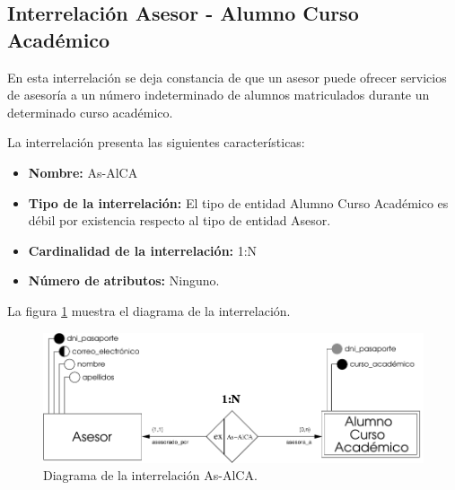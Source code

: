 \subsection{Interrelación Asesor - Alumno Curso Académico}

   \begin{description}
      \item[Definición] En esta interrelación se deja constancia de que un
      asesor puede ofrecer servicios de asesoría a un número indeterminado
      de alumnos matriculados durante un determinado curso académico.

      \item[Características] La interrelación presenta las siguientes
                             características:

         \begin{itemize}
            \item \textbf{Nombre:} As-AlCA
            \item \textbf{Tipo de la interrelación:} El tipo de entidad
                  Alumno Curso Académico es débil por existencia respecto al
                  tipo de entidad Asesor.
            \item \textbf{Cardinalidad de la interrelación:} 1:N
            \item \textbf{Número de atributos:} Ninguno.
         \end{itemize}

      \item[Diagrama] La figura \ref{diagramaAs-AlCA} muestra el diagrama de la
                      interrelación.

      \item \begin{figure}[!ht]
            \begin{center}
            \includegraphics[]{07.Modelo_Entidad-Interrelacion/7.3.Analisis_Interrelaciones/diagramas/As-AlCA.pdf}
            \caption{Diagrama de la interrelación As-AlCA.}
            \label{diagramaAs-AlCA}
            \end{center}
         \end{figure}


\end{description}
